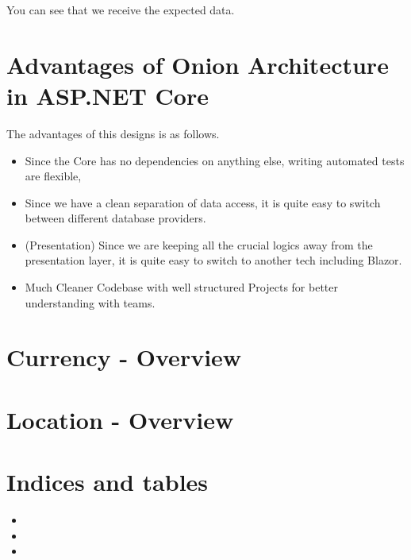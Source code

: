 \documentclass[letterpaper,10pt,english]{sphinxmanual}
\begin{document}
\noindent{}

\noindent{}

You can see that we receive the expected data.


\chapter{Advantages of Onion Architecture in ASP.NET Core}
\label{\detokenize{OnionArchitecture/details:advantages-of-onion-architecture-in-asp-net-core}}
The advantages of this designs is as follows.
\begin{itemize}
\item {} 
 \textendash{} Since the Core has no dependencies on anything else, writing automated tests are flexible,

\item {} 
 \textendash{} Since we have a clean separation of data access, it is quite easy to switch between different database providers.

\item {} 
 (Presentation) \textendash{} Since we are keeping all the crucial logics away from the presentation layer, it is quite easy to switch to another tech \textendash{} including Blazor.

\item {} 
Much Cleaner Codebase with well structured Projects for better understanding with teams.

\end{itemize}


\chapter{Currency - Overview}
\label{\detokenize{Currency/overview:currency-overview}}\label{\detokenize{Currency/overview::doc}}

\chapter{Location - Overview}
\label{\detokenize{Location/overview:location-overview}}\label{\detokenize{Location/overview::doc}}

\chapter{Indices and tables}
\label{\detokenize{index:indices-and-tables}}\begin{itemize}
\item {} 

\item {} 

\item {} 

\end{itemize}



\renewcommand{\indexname}{Index}
\printindex
\end{document}
